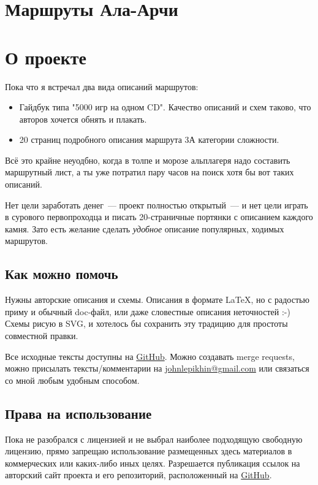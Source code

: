 \documentclass[11pt,fleqn]{report} %
\begin{document}
\chapter{Маршруты Ала-Арчи}

\routeListall

\chapter{О проекте}

\newcommand{\gitRepo}[0]{\href{https://github.com/johnlepikhin/alpine-guidebook}{GitHub}}

Пока что я встречал два вида описаний маршрутов:
\begin{itemize}
\item Гайдбук типа "5000 игр на одном CD". Качество описаний и схем
  таково, что авторов хочется обнять и плакать.
\item 20 страниц подробного описания маршрута 3А категории сложности.
\end{itemize}

Всё это крайне неуодбно, когда в толпе и морозе альплагеря надо
составить маршрутный лист, а ты уже потратил пару часов на поиск хотя
бы вот таких описаний.

Нет цели заработать денег~--- проект полностью открытый~--- и нет цели
играть в сурового первопроходца и писать 20-страничные портянки с
описанием каждого камня. Зато есть желание сделать \textit{удобное}
описание популярных, ходимых маршрутов.

\section{Как можно помочь}

Нужны авторские описания и схемы. Описания в формате \LaTeX, но с
радостью приму и обычный doc-файл, или даже словестные описания
неточностей :-) Схемы рисую в SVG, и хотелось бы сохранить эту
традицию для простоты совместной правки.

Все исходные тексты доступны на \gitRepo. Можно создавать merge
requests, можно присылать тексты/комментарии на
\href{mailto:johnlepikhin@gmail.com}{johnlepikhin@gmail.com} или
связаться со мной любым удобным способом.

\section{Права на использование}

Пока не разобрался с лицензией и не выбрал наиболее подходящую
свободную лицензию, прямо запрещаю использование размещенных здесь
материалов в коммерческих или каких-либо иных целях. Разрешается
публикация ссылок на авторский сайт проекта и его репозиторий,
расположенный на \gitRepo.
\end{document}
